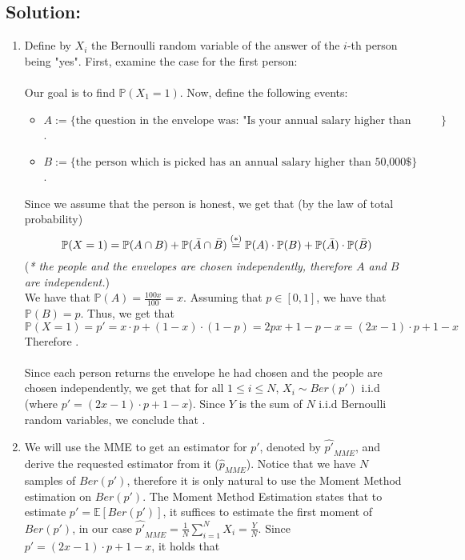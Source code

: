 \documentclass[../main.tex]{subfiles}
\begin{document}
\subsection*{Solution:}
\begin{enumerate}
    \item Define by $X_i$ the Bernoulli random variable of the answer of the $i$-th person being "yes". First, examine the case for the first person:\\
    \\
    Our goal is to find $\mathbb{P}(X_1=1)$.
    Now, define the following events:
    \begin{itemize}
        \item $A:=\{\text{the question in the envelope was: "Is your annual salary higher than 50,000\$"}\}$.
        \item $B:= \{\text{the person which is picked has an annual salary higher than 50,000\$}\}$.
    \end{itemize}
    Since we assume that the person is honest, we get that (by the law of total probability) $$\mathbb{P}(X=1) = \mathbb{P}(A\cap B)+\mathbb{P}(\Bar{A}\cap \Bar{B})\overset{(*)}{=}\mathbb{P}(A)\cdot\mathbb{P}(B)+\mathbb{P}(\Bar{A})\cdot\mathbb{P}(\Bar{B})$$
    (\emph{* the people and the envelopes are chosen independently, therefore $A$ and $B$ are independent.})\\
    We have that $\mathbb{P}(A)=\frac{100x}{100}=x$. Assuming that $p \in [0, 1]$, we have that $\mathbb{P}(B)=p$. Thus, we get that \[\mathbb{P}(X=1)=p'=x\cdot p + (1-x)\cdot (1-p) = 2px + 1 -p -x = (2x-1)\cdot p +1-x\]
    Therefore .\\\\ 
    Since each person returns the envelope he had chosen and the people are chosen independently, we get that for all $1\le i \le N$, $X_i\sim Ber(p')$ i.i.d (where $p'= (2x-1)\cdot p +1-x$). Since $Y$ is the sum of $N$ i.i.d Bernoulli random variables, we conclude that .
    \item \label{question: 2} We will use the MME to get an estimator for $p'$, denoted by $\hat{p'}_{MME}$, and derive the requested estimator from it ($\hat{p}_{MME}$). Notice that we have $N$ samples of $Ber(p')$, therefore it is only natural to use the Moment Method estimation on $Ber(p')$. The Moment Method Estimation states that to estimate $p' = \mathbb{E}[Ber(p')]$, it suffices to estimate the first moment of $Ber(p')$, in our case $\hat{p'}_{MME}=\frac{1}{N}\sum_{i=1}^N X_i=\frac{Y}{N}$. Since $p' = (2x-1)\cdot p+1-x$, it holds that 

\end{enumerate}
\end{document}
